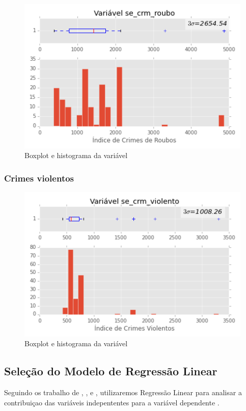 \begin{figure}[H]
	\centering
	\includegraphics[width=0.8\linewidth]{img/var_se_crm_roubo_boxhist}
	\caption{Boxplot e histograma da variável }
	\label{fig:var_se_crm_roubo_boxhist}
\end{figure} 

\subsubsection{Crimes violentos}

\begin{figure}[H]
	\centering
	\includegraphics[width=0.8\linewidth]{img/var_se_crm_violento_boxhist}
	\caption{Boxplot e histograma da variável }
	\label{fig:var_se_crm_violento_boxhist}
\end{figure} 

\subsection{Seleção do Modelo de Regressão Linear}

Seguindo os trabalho de \cite{IsmailMacGregor}, \cite{Long}, \cite{Macedo} e \cite{Neto}, utilizaremos Regressão Linear para analisar a contribuiçao das variáveis indepententes para a variável dependente .
